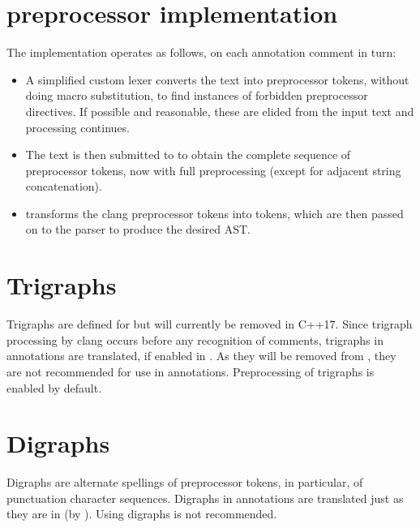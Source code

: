 \section{\fclang preprocessor implementation}
The \fclang implementation operates as follows, on each \acslpp annotation comment in turn:
\begin{itemize}
\item A simplified custom lexer converts the text into preprocessor tokens, without doing macro substitution, to find instances of forbidden preprocessor directives. If possible and reasonable, these are elided from the input text and processing continues.
\item The text is then submitted to \cl to obtain the complete sequence of preprocessor tokens, now with full preprocessing (except for adjacent string concatenation).
\item \fcl transforms the clang preprocessor tokens into \acslpp tokens, which are then passed on to the \acslpp parser to produce the desired AST.
\end{itemize}

\section{Trigraphs}

Trigraphs are defined for \cpp but will currently be removed in C++17. Since trigraph processing by clang occurs before any recognition of comments, trigraphs in \acslpp annotations are translated, if enabled in \clang. As they will be removed from \cpp, they are not recommended for use in \acslpp annotations. Preprocessing of trigraphs is enabled by default.

\section{Digraphs}
Digraphs are alternate spellings of preprocessor tokens, in particular, of
punctuation character sequences. Digraphs in \acslpp annotations are translated just as they are in \cpp (by \clang).
Using digraphs is not recommended.

